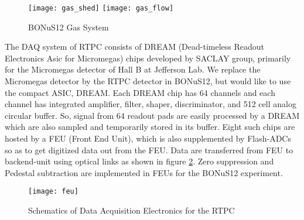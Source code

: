 \begin{figure}[H]
	\centering
	\texttt{[image: gas\_shed]}
	\texttt{[image: gas\_flow]}
	\caption{BONuS12 Gas System}
	\label{fig:gas_system}
\end{figure}

The DAQ system of RTPC consists of DREAM (Dead-timeless Readout Electronics Asic for Micromegas) chips developed by SACLAY group, primarily for the Micromegas detector of Hall B at Jefferson Lab. We replace the Micromegas detector by the RTPC detector in BONuS12, but would like to use the compact ASIC, DREAM. Each DREAM chip has 64 channels and each channel has integrated amplifier, filter, shaper, discriminator, and 512 cell analog circular buffer. So, signal from 64 readout pads are easily processed by a DREAM which are also sampled and temporarily stored in its buffer. Eight such chips are hosted by a FEU (Front End Unit), which is also supplemented by Flash-ADCs so as to get digitized data out from the FEU. Data are transferred from FEU to backend-unit using optical links as shown in figure \ref{fig:feu}. Zero suppression and Pedestal subtraction are implemented in FEUs for the BONuS12 experiment.

\begin{figure}[H]
	\centering
	\texttt{[image: feu]}
	\caption{Schematics of Data Acquisition Electronics for the RTPC}
	\label{fig:feu}
\end{figure}